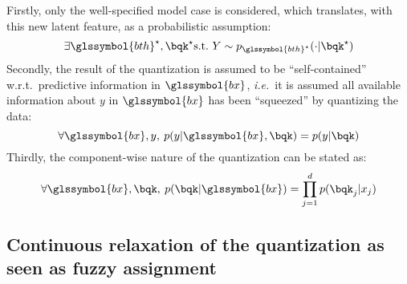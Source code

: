 Firstly, only the well-specified model case is considered, which translates, with this new latent feature, as a probabilistic assumption:
\begin{equation} \label{hyp:true}
\exists \glssymbol{bth}^\star, \bqk^\star \text{s.t.\ } Y \sim p_{\glssymbol{bth}^\star}(\cdot | \bqk^\star)
\end{equation}
Secondly, the result of the quantization is assumed to be ``self-contained'' w.r.t.\ predictive information in $\glssymbol{bx}$, \textit{i.e.}\ it is assumed all available information about $y$ in $\glssymbol{bx}$ has been ``squeezed'' by quantizing the data:
\begin{equation} \label{hyp:squeeze}
\forall \glssymbol{bx},y,\: p(y|\glssymbol{bx},\bqk) = p(y|\bqk)
\end{equation}
Thirdly, the component-wise nature of the quantization can be stated as:
\begin{equation} \label{hyp:component}
\forall \glssymbol{bx},\bqk,\: p(\bqk|\glssymbol{bx}) = \prod_{j=1}^d p(\bqk_j | x_j)
\end{equation}



\subsection{Continuous relaxation of the quantization as seen as fuzzy assignment} \label{subsec:fuzzy}

